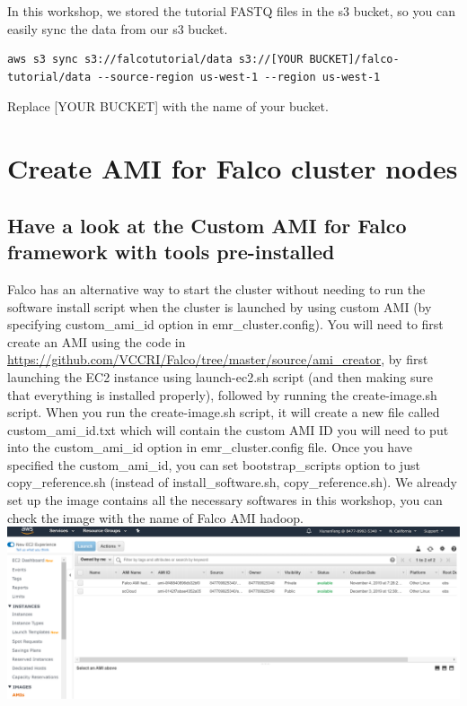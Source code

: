 \documentclass[
]{book}
\begin{document}
In this workshop, we stored the tutorial FASTQ files in the s3 bucket, so you can easily sync the data from our s3 bucket.

\begin{verbatim}
aws s3 sync s3://falcotutorial/data s3://[YOUR BUCKET]/falco-tutorial/data --source-region us-west-1 --region us-west-1
\end{verbatim}

Replace {[}YOUR BUCKET{]} with the name of your bucket.

\hypertarget{create-ami-for-falco-cluster-nodes}{%
\chapter{Create AMI for Falco cluster nodes}\label{create-ami-for-falco-cluster-nodes}}

\hypertarget{have-a-look-at-the-custom-ami-for-falco-framework-with-tools-pre-installed}{%
\section{Have a look at the Custom AMI for Falco framework with tools pre-installed}\label{have-a-look-at-the-custom-ami-for-falco-framework-with-tools-pre-installed}}

Falco has an alternative way to start the cluster without needing to run the software install script when the cluster is launched by using custom AMI (by specifying custom\_ami\_id option in emr\_cluster.config). You will need to first create an AMI using the code in \url{https://github.com/VCCRI/Falco/tree/master/source/ami_creator}, by first launching the EC2 instance using launch-ec2.sh script (and then making sure that everything is installed properly), followed by running the create-image.sh script. When you run the create-image.sh script, it will create a new file called custom\_ami\_id.txt which will contain the custom AMI ID you will need to put into the custom\_ami\_id option in emr\_cluster.config file. Once you have specified the custom\_ami\_id, you can set bootstrap\_scripts option to just copy\_reference.sh (instead of install\_software.sh, copy\_reference.sh).
We already set up the image contains all the necessary softwares in this workshop, you can check the image with the name of Falco AMI hadoop.
\includegraphics{falcoimage.PNG}
\end{document}

